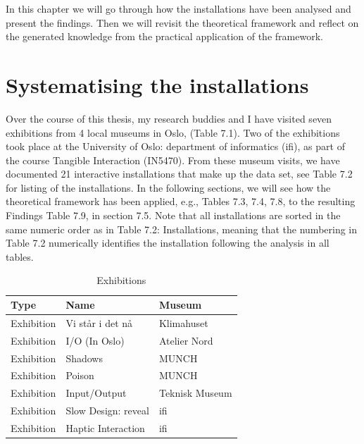 In this chapter we will go through how the installations have been analysed and present the findings. Then we will revisit the theoretical framework and reflect on the generated knowledge from the practical application of the framework.

\section{Systematising the installations}
Over the course of this thesis, my research buddies and I have visited seven exhibitions from 4 local museums in Oslo, (Table 7.1). Two of the exhibitions took place at the University of Oslo: department of informatics (ifi), as part of the course Tangible Interaction (IN5470). From these museum visits, we have documented 21 interactive installations that make up the data set, see Table 7.2 for listing of the installations. In the following sections, we will see how the theoretical framework has been applied, e.g., Tables 7.3, 7.4, 7.8, to the resulting Findings Table 7.9, in section 7.5. Note that all installations are sorted in the same numeric order as in Table 7.2: Installations, meaning that the numbering in Table 7.2 numerically identifies the installation following the analysis in all tables.

\begin{table}[H]
\centering
\begin{tabular}{| l | l| l|}
\hline
\textbf{Type} & \textbf{Name} & \textbf{Museum}\\
\hline
Exhibition & Vi står i det nå & Klimahuset \\
Exhibition & I/O (In Oslo) & Atelier Nord\\
Exhibition & Shadows & MUNCH\\
Exhibition & Poison & MUNCH \\
Exhibition & Input/Output & Teknisk Museum \\
Exhibition & Slow Design: reveal & ifi \\
Exhibition & Haptic Interaction & ifi \\
\hline
\end{tabular}
\caption{Exhibitions}
\label{tab:abc}
\end{table}


